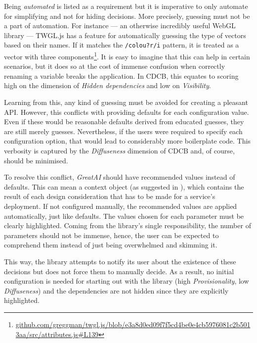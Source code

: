 Being \textit{automated} is listed as a requirement but it is imperative to only automate for simplifying and not for hiding decisions. More precisely, guessing must not be a part of automation. For instance --- an otherwise incredibly useful WebGL library --- TWGL.js has a feature for automatically guessing the type of vectors based on their names. If it matches the \texttt{/colou?r/i} pattern, it is treated as a vector with three components\footnote{\href{https://github.com/greggman/twgl.js/blob/e3a8d0ed09f7f5cd4be0e4cb5976081c2b5013aa/src/attributes.js\#L139}{\tiny github.com/greggman/twgl.js/blob/e3a8d0ed09f7f5cd4be0e4cb5976081c2b5013aa/src/attributes.js\#L139}}. It is easy to imagine that this can help in certain scenarios, but it does so at the cost of immense confusion when correctly renaming a variable breaks the application. In CDCB, this equates to scoring high on the dimension of \textit{Hidden dependencies} and low on \textit{Visibility}.

Learning from this, any kind of guessing must be avoided for creating a pleasant API. However, this conflicts with providing defaults for each configuration value. Even if these would be reasonable defaults derived from educated guesses, they are still merely guesses. Nevertheless, if the users were required to specify each configuration option, that would lead to considerably more boilerplate code. This verbosity is captured by the \textit{Diffuseness} dimension of CDCB and, of course, should be minimised.

To resolve this conflict, \textit{GreatAI} should have recommended values instead of defaults. This can mean a context object (as suggested in \cite{ousterhout2018philosophy}), which contains the result of each design consideration that has to be made for a service's deployment. If not configured manually, the recommended values are applied automatically, just like defaults. The values chosen for each parameter must be clearly highlighted. Coming from the library's single responsibility, the number of parameters should not be immense, hence, the user can be expected to comprehend them instead of just being overwhelmed and skimming it.

This way, the library attempts to notify its user about the existence of these decisions but does not force them to manually decide. As a result, no initial configuration is needed for starting out with the library (high \textit{Provisionality}, low \textit{Diffuseness}) and the dependencies are not hidden since they are explicitly highlighted.

